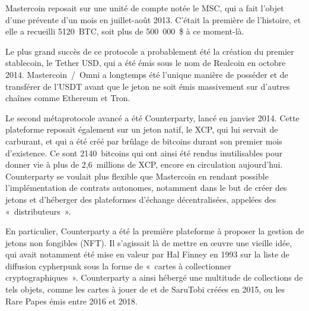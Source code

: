 Mastercoin reposait sur une unité de compte notée le MSC, qui a fait l'objet d'une prévente d'un mois en juillet-août 2013. C'était la première  de l'histoire, et elle a recueilli 5120~BTC, soit plus de 500~000~\$ à ce moment-là.

Le plus grand succès de ce protocole a probablement été la création du premier stablecoin, le Tether USD, qui a été émis sous le nom de Realcoin en octobre 2014. Mastercoin~/~Omni a longtemps été l'unique manière de posséder et de transférer de l'USDT avant que le jeton ne soit émis massivement sur d'autres chaînes comme Ethereum et Tron.

Le second métaprotocole avancé a été Counterparty, lancé en janvier 2014. Cette plateforme reposait également sur un jeton natif, le XCP, qui lui servait de carburant, et qui a été créé par brûlage de bitcoins durant son premier mois d'existence. Ce sont 2140~bitcoins qui ont ainsi été rendus inutilisables pour donner vie à plus de 2,6~millions de XCP, encore en circulation aujourd'hui. Counterparty se voulait plus flexible que Mastercoin en rendant possible l'implémentation de contrats autonomes, notamment dans le but de créer des jetons et d'héberger des plateformes d'échange décentralisées, appelées des «~distributeurs~».

En particulier, Counterparty a été la première plateforme à proposer la gestion de jetons non fongibles (NFT). Il s'agissait là de mettre en œuvre une vieille idée, qui avait notamment été mise en valeur par Hal Finney en 1993 sur la liste de diffusion cypherpunk sous la forme de «~cartes à collectionner cryptographiques~». Counterparty a ainsi hébergé une multitude de collections de tels objets, comme les cartes à jouer de  et de SaruTobi créées en 2015, ou les Rare Papes émis entre 2016 et 2018.

